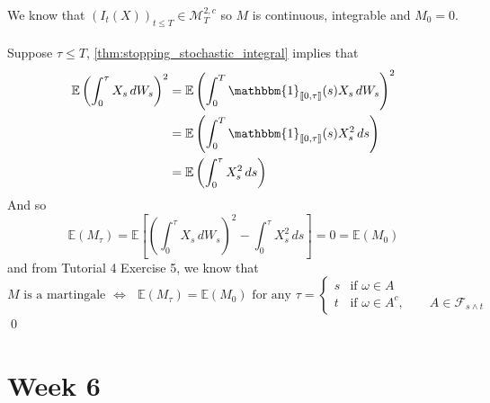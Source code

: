 \documentclass[12pt,a4paper]{article}
\newcommand{\E}{\mathbb{E}}
\renewenvironment{proof}
    {\begin{trivlist}\item[\hskip\labelsep\color{blue}\bfseries Proof:]}
    {\qed\end{trivlist}}
\begin{document}
\begin{proof}
    We know that $(I_t(X))_{t\le T}\in \mathcal{M}^{2,c}_T$ so $M$ is continuous, integrable and $M_0=0$.\\
    \\
    Suppose $\tau\le T$, \autoref{thm:stopping_stochastic_integral} implies that 
    \begin{align*}
        \E\left(\int_0^\tau X_s\, dW_s\right)^2 &= \E\left(\int_0^T \mathbbm{1}_{\llbracket 0, \tau \rrbracket} (s)X_s\,dW_s\right)^2\\
        &= \E\left(\int_0^T \mathbbm{1}_{\llbracket 0, \tau \rrbracket} (s)X_s^2\,ds\right)\\
        &=\E\left(\int_0^\tau X_s^2\,ds\right)
    \end{align*}
    And so 
    $$
    \E(M_\tau) = \E\left[\left(\int_0^\tau X_s\, dW_s\right)^2 - \int_0^\tau X_s^2 \,ds\right]=0=\E(M_0)
    $$
    and from Tutorial 4 Exercise 5, we know that
    $$
    \text{$M$ is a martingale $\iff$ $\E(M_\tau) = \E(M_0)$ for any } \tau = \begin{cases}
        s &\text{if $\omega\in A$}\\
        t & \text{if $\omega\in A^c$},\qquad A\in\mathscr{F}_{s\wedge t}
    \end{cases}
    $$
\end{proof}
\pagebreak
\section{Week 6}
\end{document}
